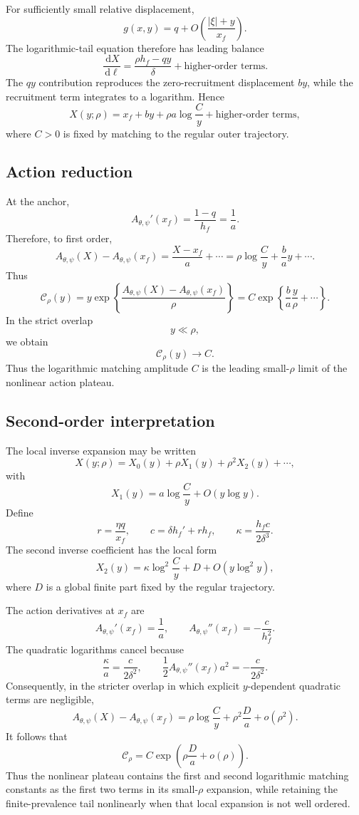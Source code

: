 \documentclass[11pt]{article}
\newcommand{\Apsi}{A_{\theta,\psi}}
\newcommand{\xf}{x_f}
\newcommand{\dd}{\,\mathrm{d}}
\newcommand{\CalC}{\mathcal C_\rho}
\begin{document}
For sufficiently small relative displacement,
\[
g(x,y)=q+O\left(\frac{|\xi|+y}{\xf}\right).
\]
The logarithmic-tail equation therefore has leading balance
\[
\frac{\dd X}{\dd\ell}
=\frac{\rho h_f-qy}{\delta}+\text{higher-order terms}.
\]
The $qy$ contribution reproduces the zero-recruitment displacement $by$, while the recruitment term integrates to a logarithm. Hence
\[
\boxed{
X(y;\rho)
=\xf+by+\rho a\log\frac C y+\text{higher-order terms},
}
\]
where $C>0$ is fixed by matching to the regular outer trajectory.

\subsection{Action reduction}
At the anchor,
\[
\Apsi'(\xf)
=\frac{1-q}{h_f}
=\frac1a.
\]
Therefore, to first order,
\[
\Apsi(X)-\Apsi(\xf)
=\frac{X-\xf}{a}+\cdots
=\rho\log\frac C y+\frac ba y+\cdots.
\]
Thus
\[
\CalC(y)
=y\exp\left\{\frac{\Apsi(X)-\Apsi(\xf)}\rho\right\}
=C\exp\left\{\frac{b}{a}\frac y\rho+\cdots\right\}.
\]
In the strict overlap
\[
y\ll\rho,
\]
we obtain
\[
\boxed{\CalC(y)\to C.}
\]
Thus the logarithmic matching amplitude $C$ is the leading small-$\rho$ limit of the nonlinear action plateau.

\subsection{Second-order interpretation}
The local inverse expansion may be written
\[
X(y;\rho)
=X_0(y)+\rho X_1(y)+\rho^2X_2(y)+\cdots,
\]
with
\[
X_1(y)=a\log\frac C y+O(y\log y).
\]
Define
\[
r=\frac{\eta q}{\xf},
\qquad
c=\delta h_f'+rh_f,
\qquad
\kappa=\frac{h_fc}{2\delta^3}.
\]
The second inverse coefficient has the local form
\[
X_2(y)=\kappa\log^2\frac C y+D+O(y\log^2y),
\]
where $D$ is a global finite part fixed by the regular trajectory.

The action derivatives at $\xf$ are
\[
\Apsi'(\xf)=\frac1a,
\qquad
\Apsi''(\xf)=-\frac{c}{h_f^2}.
\]
The quadratic logarithms cancel because
\[
\frac\kappa a
=\frac{c}{2\delta^2},
\qquad
\frac12\Apsi''(\xf)a^2
=-\frac{c}{2\delta^2}.
\]
Consequently, in the stricter overlap in which explicit $y$-dependent quadratic terms are negligible,
\[
\boxed{
\Apsi(X)-\Apsi(\xf)
=\rho\log\frac C y
+\rho^2\frac Da
+o(\rho^2).
}
\]
It follows that
\[
\boxed{
\CalC
=C\exp\left(\rho\frac Da+o(\rho)\right).
}
\]
Thus the nonlinear plateau contains the first and second logarithmic matching constants as the first two terms in its small-$\rho$ expansion, while retaining the finite-prevalence tail nonlinearly when that local expansion is not well ordered.
\end{document}
